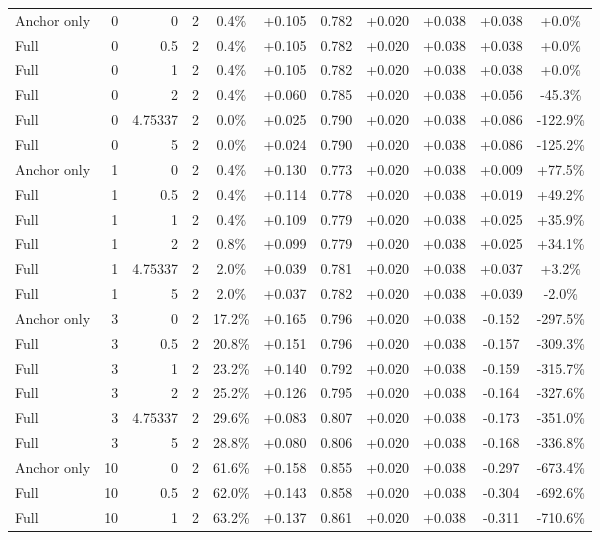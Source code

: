 \begin{table}[htbp]
\begin{tabular}{lrrrccccccc}
Anchor only & 0 & 0 & 2 & 0.4\% & +0.105 & 0.782 & +0.020 & +0.038 & +0.038 & +0.0\% \\
Full & 0 & 0.5 & 2 & 0.4\% & +0.105 & 0.782 & +0.020 & +0.038 & +0.038 & +0.0\% \\
Full & 0 & 1 & 2 & 0.4\% & +0.105 & 0.782 & +0.020 & +0.038 & +0.038 & +0.0\% \\
Full & 0 & 2 & 2 & 0.4\% & +0.060 & 0.785 & +0.020 & +0.038 & +0.056 & -45.3\% \\
Full & 0 & 4.75337 & 2 & 0.0\% & +0.025 & 0.790 & +0.020 & +0.038 & +0.086 & -122.9\% \\
Full & 0 & 5 & 2 & 0.0\% & +0.024 & 0.790 & +0.020 & +0.038 & +0.086 & -125.2\% \\
Anchor only & 1 & 0 & 2 & 0.4\% & +0.130 & 0.773 & +0.020 & +0.038 & +0.009 & +77.5\% \\
Full & 1 & 0.5 & 2 & 0.4\% & +0.114 & 0.778 & +0.020 & +0.038 & +0.019 & +49.2\% \\
Full & 1 & 1 & 2 & 0.4\% & +0.109 & 0.779 & +0.020 & +0.038 & +0.025 & +35.9\% \\
Full & 1 & 2 & 2 & 0.8\% & +0.099 & 0.779 & +0.020 & +0.038 & +0.025 & +34.1\% \\
Full & 1 & 4.75337 & 2 & 2.0\% & +0.039 & 0.781 & +0.020 & +0.038 & +0.037 & +3.2\% \\
Full & 1 & 5 & 2 & 2.0\% & +0.037 & 0.782 & +0.020 & +0.038 & +0.039 & -2.0\% \\
Anchor only & 3 & 0 & 2 & 17.2\% & +0.165 & 0.796 & +0.020 & +0.038 & -0.152 & -297.5\% \\
Full & 3 & 0.5 & 2 & 20.8\% & +0.151 & 0.796 & +0.020 & +0.038 & -0.157 & -309.3\% \\
Full & 3 & 1 & 2 & 23.2\% & +0.140 & 0.792 & +0.020 & +0.038 & -0.159 & -315.7\% \\
Full & 3 & 2 & 2 & 25.2\% & +0.126 & 0.795 & +0.020 & +0.038 & -0.164 & -327.6\% \\
Full & 3 & 4.75337 & 2 & 29.6\% & +0.083 & 0.807 & +0.020 & +0.038 & -0.173 & -351.0\% \\
Full & 3 & 5 & 2 & 28.8\% & +0.080 & 0.806 & +0.020 & +0.038 & -0.168 & -336.8\% \\
Anchor only & 10 & 0 & 2 & 61.6\% & +0.158 & 0.855 & +0.020 & +0.038 & -0.297 & -673.4\% \\
Full & 10 & 0.5 & 2 & 62.0\% & +0.143 & 0.858 & +0.020 & +0.038 & -0.304 & -692.6\% \\
Full & 10 & 1 & 2 & 63.2\% & +0.137 & 0.861 & +0.020 & +0.038 & -0.311 & -710.6\% \\

\end{tabular}
\end{table}
